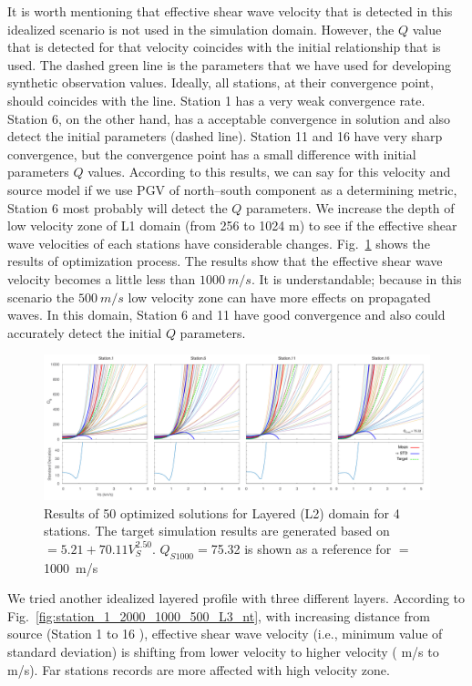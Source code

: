 It is worth mentioning that effective shear wave velocity that is detected in this idealized scenario is not used in the simulation domain. However, the $Q$ value that is detected for that velocity coincides with the initial \qsvs{} relationship that is used.  The dashed green line is the parameters that we have used for developing synthetic observation values. Ideally, all stations, at their convergence point, should coincides with the line. Station 1 has a very weak convergence rate. Station 6, on the other hand, has a acceptable convergence in solution and also detect the initial parameters (dashed line). Station 11 and 16 have very sharp convergence, but the convergence point has a small difference with initial parameters $Q$ values. According to this results, we can say for this velocity and source model if we use PGV of north--south component as a determining metric, Station 6 most probably will detect the $Q$ parameters.
We increase the depth of low velocity zone of L1 domain (from 256 to 1024 m) to see if the effective shear wave velocities of each stations have considerable changes. Fig.~\ref{fig:station_1_1000_500_2_L2} shows the results of optimization process. The results show that the effective shear wave velocity becomes a little less than $1000~m/s$. It is understandable; because in this scenario the $500~m/s$ low velocity zone can have more effects on propagated waves. In this domain, Station 6 and 11 have good convergence and also could accurately detect the initial $Q$ parameters. 

  \begin{figure}[ht]
    \centering
    \includegraphics[width=\textwidth]{figures/pdf/Figure_16-L2-pgv.pdf}
    \caption{Results of 50 optimized solutions for Layered (L2) domain for 4 stations. The target simulation results are generated based on \qs{}$=5.21+70.11V_{S}^{2.50}$. $Q_{S1000}=$75.32 is shown as a reference for \vs{}$=$1000~m/s}
    \label{fig:station_1_1000_500_2_L2}
\end{figure}
 

We tried another idealized layered profile with three different layers. According to Fig.~\ref{fig:station_1_2000_1000_500_L3_nt}, with increasing distance from source (Station 1 to 16 ), effective shear wave velocity (i.e., minimum value of standard deviation) is shifting from lower velocity to higher velocity ( m/s to m/s). Far stations records are more affected with high velocity zone. 
 
